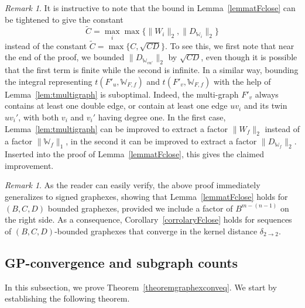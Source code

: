 \documentclass{amsart}
\numberwithin{equation}{section}
\numberwithin{figure}{section}
\theoremstyle{definition}
\theoremstyle{remark}
\newtheorem{remark}[theorem]{Remark}
\newcommand{\cW}{\mathbb{W}}
\newcommand{\deltt}{\delta_{2\to 2}}
\begin{document}
\begin{remark}
It is instructive to note that the bound in Lemma~\ref{lemmatFclose} can be
tightened to give the constant
\[
\widetilde C=\max_i\max\{\|W_i\|_2,\|D_{\cW_i}\|_2\}
\]
instead of the constant $\widetilde C=\max\{C,\sqrt{CD}\}$. To see this, we
first note that near the end of the proof, we bounded $\|D_{\cW_{vu'}}\|_2$
by $\sqrt {CD}$, even though it is possible that the first term is finite
while the second is infinite. In a similar way, bounding the integral
representing $t(F'_u,\cW_{F,f})$ and $t(F'_v,\cW_{F,f})$ with the help of
Lemma~\ref{lem:tmultigraph} is suboptimal. Indeed, the multi-graph $F'_v$
always contains at least one double edge, or contain at least one edge $uv_i$
and its twin $uv_i'$, with both $v_i$ and $v_i'$ having degree one. In the
first case, Lemma~\ref{lem:tmultigraph} can be improved to extract a factor
$\|W_f\|_2$ instead of a factor $\|\cW_f\|_1$, in the second it can be
improved to extract a factor $\|D_{\cW_{f}}\|_2$. Inserted into the proof of
Lemma~\ref{lemmatFclose}, this gives the claimed improvement.
\end{remark}

\begin{remark}\label{rem:Fclose}
As the reader can easily verify, the above proof immediately generalizes to
signed graphexes, showing that Lemma~\ref{lemmatFclose} holds for $(B,C,D)$
bounded graphexes, provided we include a factor of $B^{m-(n-1)}$ on the right
side. As a consequence, Corollary~\ref{corrolaryFclose} holds for sequences
of $(B,C,D)$-bounded graphexes that converge in the kernel distance $\deltt$.
\end{remark}

\subsection{GP-convergence and subgraph counts} \label{sec:samplingandsubgraphs}

In this subsection, we prove Theorem~\ref{theoremgraphexconveq}. We start by
establishing the following theorem.
\end{document}

